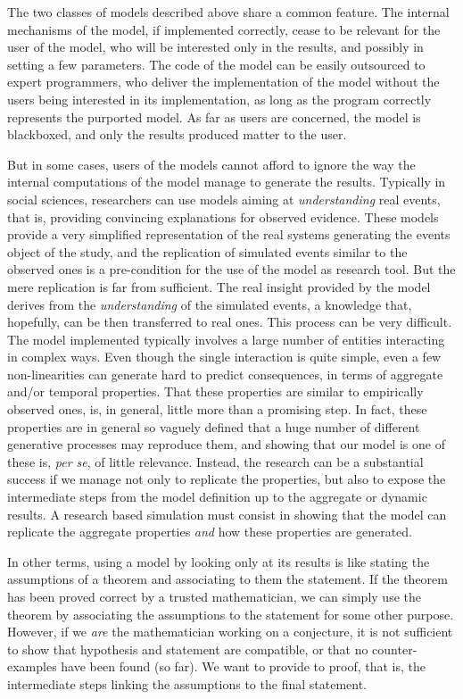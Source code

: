 \documentclass [11pt,a4paper] {book}
\begin{document}
The two classes of models described above share a common feature. The internal mechanisms of the model, if implemented correctly, cease to be relevant for the user of the model, who will be interested only in the results, and possibly in setting a few parameters. The code of the model can be easily outsourced to expert programmers, who deliver the implementation of the model without the users being interested in its implementation, as long as the program correctly represents the purported model. As far as users are concerned, the model is blackboxed, and only the results produced matter to the user.

But in some cases, users of the models cannot afford to ignore the way the internal computations of the model manage to generate the results. Typically in social sciences, researchers can use models aiming at \textit{understanding} real events, that is, providing convincing explanations for observed evidence. These models provide a very simplified representation of the real systems generating the events object of the study, and the replication of simulated events similar to the observed ones is a pre-condition for the use of the model as research tool. But the mere replication is far from sufficient. The real insight provided by the model derives from the \textit{understanding} of the simulated events, a knowledge that, hopefully, can be then transferred to real ones. This process can be very difficult. The model implemented typically involves a large number of entities interacting in complex ways. Even though the single interaction is quite simple, even a few non-linearities can generate hard to predict consequences, in terms of aggregate and/or temporal properties. That these properties are similar to empirically observed ones, is, in general, little more than a promising step. In fact, these properties are in general so vaguely defined that a huge number of different generative processes may reproduce them, and showing that our model is one of these is, \textit{per se}, of little relevance. Instead, the research can be a substantial success if we manage not only to replicate the properties, but also to expose the intermediate steps from the model definition up to the aggregate or dynamic results. A research based simulation must consist in showing that the model can replicate the aggregate properties \textit{and} how these properties are generated.

In other terms, using a model by looking only at its results is like stating the assumptions of a theorem and associating to them the statement. If the theorem has been proved correct by a trusted mathematician, we can simply use the theorem by associating the assumptions to the statement for some other purpose. However, if we \textit{are} the mathematician working on a conjecture, it is not sufficient to show that hypothesis and statement are compatible, or that no counter-examples have been found (so far). We want to provide to proof, that is, the intermediate steps linking the assumptions to the final statement. 
\end{document}
